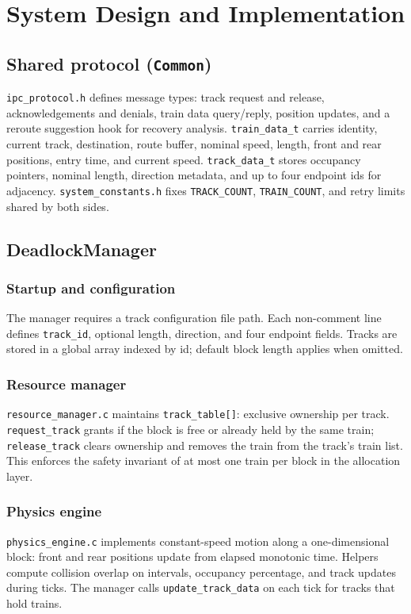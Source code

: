 \documentclass[11pt,a4paper]{article}
\begin{document}
\section{System Design and Implementation}

\subsection{Shared protocol (\texttt{Common})}
\texttt{ipc\_protocol.h} defines message types: track request and release, acknowledgements and denials, train data query/reply, position updates, and a reroute suggestion hook for recovery analysis. \texttt{train\_data\_t} carries identity, current track, destination, route buffer, nominal speed, length, front and rear positions, entry time, and current speed. \texttt{track\_data\_t} stores occupancy pointers, nominal length, direction metadata, and up to four endpoint ids for adjacency. \texttt{system\_constants.h} fixes \texttt{TRACK\_COUNT}, \texttt{TRAIN\_COUNT}, and retry limits shared by both sides.

\subsection{DeadlockManager}
\subsubsection{Startup and configuration}
The manager requires a track configuration file path. Each non-comment line defines \texttt{track\_id}, optional length, direction, and four endpoint fields. Tracks are stored in a global array indexed by id; default block length applies when omitted.

\subsubsection{Resource manager}
\texttt{resource\_manager.c} maintains \texttt{track\_table[]}: exclusive ownership per track. \texttt{request\_track} grants if the block is free or already held by the same train; \texttt{release\_track} clears ownership and removes the train from the track's train list. This enforces the safety invariant of at most one train per block in the allocation layer.

\subsubsection{Physics engine}
\texttt{physics\_engine.c} implements constant-speed motion along a one-dimensional block: front and rear positions update from elapsed monotonic time. Helpers compute collision overlap on intervals, occupancy percentage, and track updates during ticks. The manager calls \texttt{update\_track\_data} on each tick for tracks that hold trains.
\end{document}
